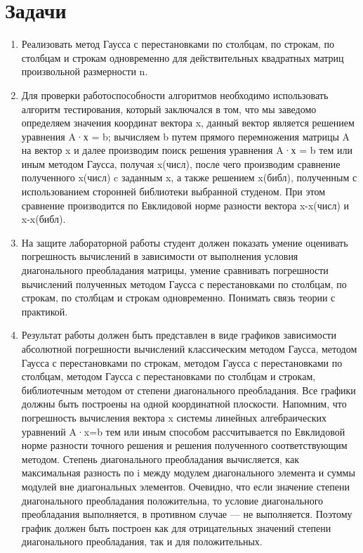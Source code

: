 \documentclass[a4paper, 14pt]{extarticle}
\begin{document}
\section{Задачи}\label{Sect::task}
\par
\renewcommand{\labelenumii}{\arabic{enumi}.\arabic{enumii}.}
\begin{enumerate} 
    \item Реализовать метод Гаусса с перестановками по столбцам, по строкам, по столбцам и строкам одновременно для действительных квадратных матриц произвольной размерности n. 
    \item Для проверки работоспособности алгоритмов необходимо использовать алгоритм тестирования, который заключался в том, что мы заведомо определяем значения координат вектора x, данный вектор является решением уравнения A·х = b; вычисляем b путем прямого перемножения матрицы A на вектор x и далее производим поиск решения уравнения A·х = b тем или иным методом Гаусса,  получая x(числ), после чего производим сравнение полученного  x(числ) c заданным x, а также решением x(библ), полученным с использованием сторонней библиотеки выбранной студеном. При этом сравнение производится по Евклидовой норме разности вектора x-x(числ) и x-x(библ).
    \item На защите лабораторной работы студент должен показать умение оценивать погрешность вычислений в зависимости от выполнения  условия диагонального преобладания матрицы, умение сравнивать погрешности вычислений полученных методом Гаусса с перестановками по столбцам, по строкам, по столбцам и строкам одновременно. Понимать связь теории с практикой.
    \item Результат работы должен быть представлен в виде графиков зависимости абсолютной погрешности вычислений классическим методом Гаусса, методом Гаусса с перестановками по строкам, методом Гаусса с перестановками по столбцам, методом Гаусса с перестановками по столбцам и строкам, библиотечным методом от степени диагонального преобладания. Все графики должны быть построены на одной координатной плоскости. Напомним, что погрешность вычисления вектора x системы линейных алгебраических уравнений A·x=b тем или иным способом рассчитывается по Евклидовой норме разности точного решения и решения полученного соответствующим методом. Степень диагонального преобладания вычисляется, как максимальная разность по i между модулем диагонального элемента и суммы модулей вне диагональных элементов. Очевидно, что если значение степени диагонального преобладания положительна, то условие диагонального преобладания выполняется, в противном случае — не выполняется. Поэтому график должен быть построен как для отрицательных значений  степени диагонального преобладания, так и для положительных.
\end{enumerate}
\end{document}
